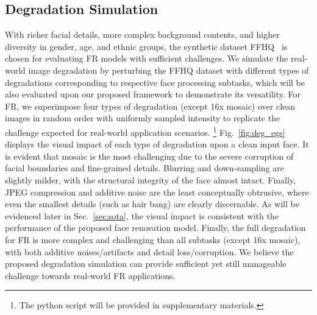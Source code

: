 \documentclass[sigconf]{acmart}
\begin{document}
\subsection{Degradation Simulation}\label{sec:train_setting}

With richer facial details, more complex background contents, and higher diversity in gender, age, and ethnic groups, the synthetic dataset FFHQ~\cite{stylegan_ffhq} is chosen for evaluating FR models with sufficient challenges. We simulate the real-world image degradation by perturbing the FFHQ dataset with different types of degradations corresponding to respective face processing subtasks, which will be also evaluated upon our proposed framework to demonstrate its versatility. For FR, we superimpose four types of degradation (except 16x mosaic) over clean images in random order with uniformly sampled intensity to replicate the challenge expected for real-world application scenarios.
\footnote{The python script will be provided in supplementary materials.}
Fig.~\ref{fig:deg_egs} displays the visual impact of each type of degradation upon a clean input face. It is evident that mosaic is the most challenging due to the severe corruption of facial boundaries and fine-grained details. Blurring and down-sampling are slightly milder, with the structural integrity of the face almost intact. Finally, JPEG compression and additive noise are the least conceptually obtrusive, where even the smallest details (such as hair bang) are clearly discernable. As will be evidenced later in Sec.~\ref{sec:sota}, the visual impact is consistent with the performance of the proposed face renovation model. Finally, the full degradation for FR is more complex and challenging than all subtasks (except 16x mosaic), with both additive noises/artifacts and detail loss/corruption. We believe the proposed degradation simulation can provide sufficient yet still manageable challenge towards real-world FR applications.
\end{document}
